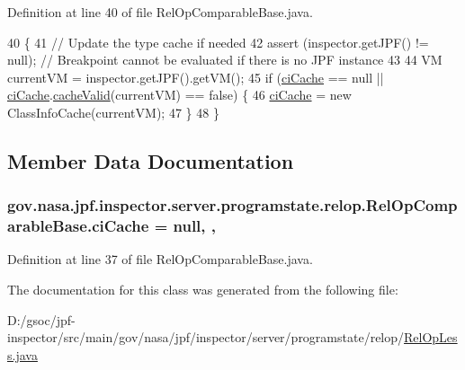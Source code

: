 Definition at line 40 of file Rel\+Op\+Comparable\+Base.\+java.


\begin{DoxyCode}
40                                                                \{
41     \textcolor{comment}{// Update the type cache if needed}
42     assert (inspector.getJPF() != null); \textcolor{comment}{// Breakpoint cannot be evaluated if there is no JPF instance}
43 
44     VM currentVM = inspector.getJPF().getVM();
45     \textcolor{keywordflow}{if} (\hyperlink{classgov_1_1nasa_1_1jpf_1_1inspector_1_1server_1_1programstate_1_1relop_1_1_rel_op_comparable_base_a3bd22b88a44dff54d68b1d8a3e8f3d0a}{ciCache} == null || \hyperlink{classgov_1_1nasa_1_1jpf_1_1inspector_1_1server_1_1programstate_1_1relop_1_1_rel_op_comparable_base_a3bd22b88a44dff54d68b1d8a3e8f3d0a}{ciCache}.\hyperlink{classgov_1_1nasa_1_1jpf_1_1inspector_1_1utils_1_1_class_info_cache_ac71fb1624b72457166c1326d44fb50c5}{cacheValid}(currentVM) == \textcolor{keyword}{false}) \{
46       \hyperlink{classgov_1_1nasa_1_1jpf_1_1inspector_1_1server_1_1programstate_1_1relop_1_1_rel_op_comparable_base_a3bd22b88a44dff54d68b1d8a3e8f3d0a}{ciCache} = \textcolor{keyword}{new} ClassInfoCache(currentVM);
47     \}
48   \}
\end{DoxyCode}


\subsection{Member Data Documentation}
\subsubsection[{\texorpdfstring{ci\+Cache}{ciCache}}]{ gov.\+nasa.\+jpf.\+inspector.\+server.\+programstate.\+relop.\+Rel\+Op\+Comparable\+Base.\+ci\+Cache = null\hspace{0.3cm}{\ttfamily [static]}, {\ttfamily [protected]}, {\ttfamily [inherited]}}\hypertarget{classgov_1_1nasa_1_1jpf_1_1inspector_1_1server_1_1programstate_1_1relop_1_1_rel_op_comparable_base_a3bd22b88a44dff54d68b1d8a3e8f3d0a}{}\label{classgov_1_1nasa_1_1jpf_1_1inspector_1_1server_1_1programstate_1_1relop_1_1_rel_op_comparable_base_a3bd22b88a44dff54d68b1d8a3e8f3d0a}


Definition at line 37 of file Rel\+Op\+Comparable\+Base.\+java.



The documentation for this class was generated from the following file\+:\begin{DoxyCompactItemize}
\item 
D\+:/gsoc/jpf-\/inspector/src/main/gov/nasa/jpf/inspector/server/programstate/relop/\hyperlink{_rel_op_less_8java}{Rel\+Op\+Less.\+java}\end{DoxyCompactItemize}
